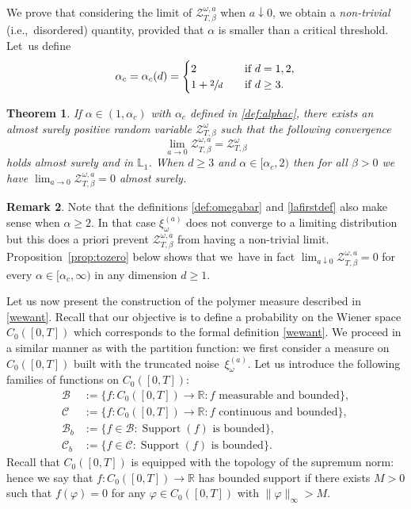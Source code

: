 \documentclass[11pt]{article}
\newcommand{\ie}{i.e.,\xspace}
\numberwithin{equation}{section}
\let\mathcal\mathscr
\let\sep:
\let\ra\rightarrow
\newtheorem{theorem}{Theorem}[section]
\theoremstyle{definition}
\newtheorem{rem}[theorem]{Remark}
\newcommand{\cB}{{\ensuremath{\mathcal B}} }
\newcommand{\cC}{{\ensuremath{\mathcal C}} }
\newcommand{\cZ}{{\ensuremath{\mathcal Z}} }
\DeclareMathOperator*{\supp}{\mathrm{Support}}
\newcommand{\bbL}{{\ensuremath{\mathbb L}} }
\newcommand{\bbR}{{\ensuremath{\mathbb R}} }
\let\go\omega
\begin{document}
We prove that considering the limit of $\cZ^{\go,a}_{T,\beta}$ when $a\downarrow0$, we obtain a \emph{non-trivial} (\ie \ disordered) quantity, provided that $\alpha$ is smaller than a critical threshold.
Let~us define
\begin{equation}
\label{def:alphac}
\alpha_c=\alpha_c(d) =
\begin{cases}
2 & \quad \text{if } d=1,2,\\
1+ \sfrac{2}{d}& \quad \text{if } d\ge 3.
\end{cases}
\end{equation}

\begin{theorem}
\label{thm:continuous}
If $\alpha\in (1,\alpha_c)$ with $\alpha_c$ defined in \eqref{def:alphac},
there exists an almost surely positive random variable $\cZ^{\go }_{T, \beta}$
such that the following convergence
\begin{equation*}
\lim_{a \to 0}\cZ^{\go,a }_{T, \beta}=\cZ^{\go }_{T, \beta}
\end{equation*}
holds almost surely and in $\bbL_1$.
When $d\ge 3$ and $\alpha\in [\alpha_c,2)$ then for all $\beta>0$ we have
$\lim_{a \to 0}\cZ^{\go,a }_{T, \beta}=0$ almost surely.
\end{theorem}

\begin{rem}
Note that the definitions \eqref{def:omegabar} and \eqref{lafirstdef} also make sense when $\alpha\ge 2$. In that case $\xi^{(a)}_{\go}$ does not converge to a limiting distribution but this does a priori prevent $\cZ^{\go,a}_{T,\beta}$ from having a non-trivial limit.
Proposition~\ref{prop:tozero} below shows that we~have in fact $\lim_{a\downarrow 0}\cZ^{\go,a }_{T, \beta} = 0$ for every $\alpha\in [\alpha_c,\infty)$ in any dimension $d\ge 1$.
\end{rem}

Let us now present the construction of the polymer measure described in \eqref{wewant}.
Recall that our objective is to define a probability on
the Wiener space $C_0([0,T])$
which corresponds to the formal definition \eqref{wewant}.
We proceed in a similar manner as with the partition function: we first consider a measure on $C_0([0,T])$ built with the truncated noise~$\xi_{\go}^{(a)}$.
Let us introduce the following families of functions on $C_0([0,T])$:%
\begin{equation}\label{thespaces}
\begin{split}
\cB&:=\{ f\colon C_0([0,T]) \ra \bbR \sep f \text{ measurable and bounded}\},\\
\cC&:=\{ f \colon C_0([0,T]) \ra \bbR \sep f \text{ continuous and bounded}\},\\
\cB_b&:=\{ f\in \cB \sep \supp(f) \text{ is bounded}\},\\
\cC_b&:=\{ f\in \cC \sep \supp(f) \text{ is bounded}\}.
\end{split}
\end{equation}
Recall that $C_0([0,T])$ is equipped with the topology of the supremum norm: hence we say that $f\colon C_0([0,T]) \to \bbR$ has bounded support if there exists $M>0$ such that $f(\varphi) =0$ for any $\varphi \in C_0([0,T])$ with $\|\varphi\|_{\infty} >M$.
\end{document}
